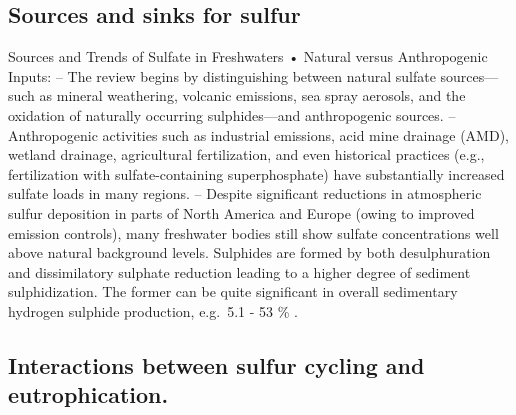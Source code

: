 \documentclass[12pt,twoside]{book}
\begin{document}
\subsection{Sources and sinks for sulfur}\label{sources-and-sinks-for-sulfur}

Sources and Trends of Sulfate in Freshwaters
• Natural versus Anthropogenic Inputs:
-- The review begins by distinguishing between natural sulfate sources---such as mineral weathering, volcanic emissions, sea spray aerosols, and the oxidation of naturally occurring sulphides---and anthropogenic sources.
-- Anthropogenic activities such as industrial emissions, acid mine drainage (AMD), wetland drainage, agricultural fertilization, and even historical practices (e.g., fertilization with sulfate-containing superphosphate) have substantially increased sulfate loads in many regions.
-- Despite significant reductions in atmospheric sulfur deposition in parts of North America and Europe (owing to improved emission controls), many freshwater bodies still show sulfate concentrations well above natural background levels.
Sulphides are formed by both desulphuration and dissimilatory sulphate reduction leading to a higher degree of sediment sulphidization. The former can be quite significant in overall sedimentary hydrogen sulphide production, e.g.~5.1 - 53 \% \citep{Dunnette1985}.

\subsection{Interactions between sulfur cycling and eutrophication.}\label{interactions-between-sulfur-cycling-and-eutrophication.}
\end{document}
